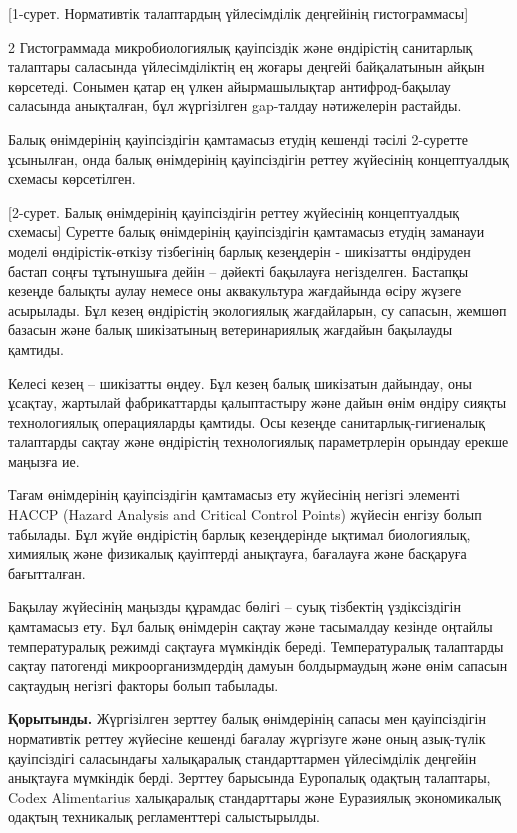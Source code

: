 [1-сурет. Нормативтік талаптардың
үйлесімділік деңгейінің гистограммасы]

\begin{multicols}{2}
Гистограммада микробиологиялық қауіпсіздік және өндірістің санитарлық
талаптары саласында үйлесімділіктің ең жоғары деңгейі байқалатынын айқын
көрсетеді. Сонымен қатар ең үлкен айырмашылықтар антифрод-бақылау
саласында анықталған, бұл жүргізілген gap-талдау нәтижелерін растайды.

Балық өнімдерінің қауіпсіздігін қамтамасыз етудің кешенді тәсілі
2-суретте ұсынылған, онда балық өнімдерінің қауіпсіздігін реттеу
жүйесінің концептуалдық схемасы көрсетілген.

[2-сурет. Балық өнімдерінің
қауіпсіздігін реттеу жүйесінің концептуалдық схемасы]
\vspace{-1em}
Суретте балық өнімдерінің қауіпсіздігін қамтамасыз етудің заманауи
моделі өндірістік-өткізу тізбегінің барлық кезеңдерін - шикізатты
өндіруден бастап соңғы тұтынушыға дейін -- дәйекті бақылауға
негізделген. Бастапқы кезеңде балықты аулау немесе оны аквакультура
жағдайында өсіру жүзеге асырылады. Бұл кезең өндірістің экологиялық
жағдайларын, су сапасын, жемшөп базасын және балық шикізатының
ветеринариялық жағдайын бақылауды қамтиды.

Келесі кезең -- шикізатты өңдеу. Бұл кезең балық шикізатын дайындау, оны
ұсақтау, жартылай фабрикаттарды қалыптастыру және дайын өнім өндіру
сияқты технологиялық операцияларды қамтиды. Осы кезеңде
санитарлық-гигиеналық талаптарды сақтау және өндірістің технологиялық
параметрлерін орындау ерекше маңызға ие.

Тағам өнімдерінің қауіпсіздігін қамтамасыз ету жүйесінің негізгі
элементі HACCP (Hazard Analysis and Critical Control Points) жүйесін
енгізу болып табылады. Бұл жүйе өндірістің барлық кезеңдерінде ықтимал
биологиялық, химиялық және физикалық қауіптерді анықтауға, бағалауға
және басқаруға бағытталған.

Бақылау жүйесінің маңызды құрамдас бөлігі -- суық тізбектің
үздіксіздігін қамтамасыз ету. Бұл балық өнімдерін сақтау және тасымалдау
кезінде оңтайлы температуралық режимді сақтауға мүмкіндік береді.
Температуралық талаптарды сақтау патогенді микроорганизмдердің дамуын
болдырмаудың және өнім сапасын сақтаудың негізгі факторы болып табылады.

{\bfseries Қорытынды.} Жүргізілген зерттеу балық өнімдерінің сапасы мен
қауіпсіздігін нормативтік реттеу жүйесіне кешенді бағалау жүргізуге және
оның азық-түлік қауіпсіздігі саласындағы халықаралық стандарттармен
үйлесімділік деңгейін анықтауға мүмкіндік берді. Зерттеу барысында
Еуропалық одақтың талаптары, Codex Alimentarius халықаралық стандарттары
және Еуразиялық экономикалық одақтың техникалық регламенттері
салыстырылды.


\end{multicols}
